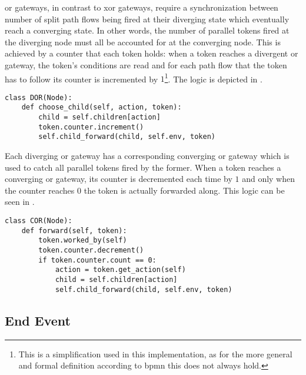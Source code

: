 \gls{or} gateways, in contrast to \gls{xor} gateways, require a synchronization between number of split path flows being fired at their diverging state which eventually reach a converging state. In other words, the number of parallel tokens fired at the diverging node must all be accounted for at the converging node. This is achieved by a counter that each token holds: when a token reaches a divergent \gls{or} gateway, the token's conditions are read and for each path flow that the token has to follow its counter is incremented by $1$\footnote{This is a simplification used in this implementation, as for the more general and formal definition according to \gls{bpmn} this does not always hold.}. The logic is depicted in .

\begin{lstlisting}[caption=Token's counter increment logic at a divergent \glsentryshort{or} gateway in which the corresponding counter object is incremeted by $1$ at each method's call.,label=lst:or_counter_increment,style=CustomPython]
class DOR(Node):
    def choose_child(self, action, token):
        child = self.children[action]
        token.counter.increment()
        self.child_forward(child, self.env, token)
\end{lstlisting}

Each diverging \gls{or} gateway has a corresponding converging \gls{or} gateway which is used to catch all parallel tokens fired by the former. When a token reaches a converging \gls{or} gateway, its counter is decremented each time by $1$ and only when the counter reaches $0$ the token is actually forwarded along. This logic can be seen in .

\begin{lstlisting}[caption=Token's counter decrement logic at a convergent \glsentryshort{or} gateway in which the corresponding counter object is decremented by $1$ at each method's call.,label=lst:or_counter_decrement,style=CustomPython]
class COR(Node):
    def forward(self, token):
        token.worked_by(self)
        token.counter.decrement()
        if token.counter.count == 0:
            action = token.get_action(self)
            child = self.children[action]
            self.child_forward(child, self.env, token)
\end{lstlisting}

\subsection{End Event}

